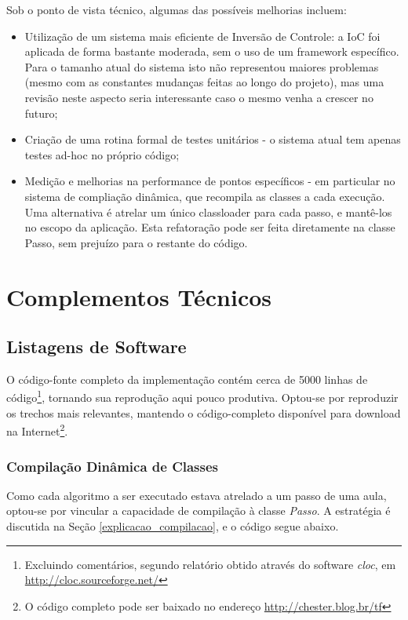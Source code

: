 \documentclass{abnt}
\begin{document}
Sob o ponto de vista técnico, algumas das possíveis melhorias incluem:

\begin{itemize}
\item Utilização de um sistema mais eficiente de Inversão de Controle: a IoC foi aplicada de forma bastante moderada, sem o uso de um framework específico. Para o tamanho atual do sistema isto não representou maiores problemas (mesmo com as constantes mudanças feitas ao longo do projeto), mas uma revisão neste aspecto seria interessante caso o mesmo venha a crescer no futuro;
\item Criação de uma rotina formal de testes unitários - o sistema atual tem apenas testes ad-hoc no próprio código;
\item Medição e melhorias na performance de pontos específicos - em particular no sistema de compliação dinâmica, que recompila as classes a cada execução. Uma alternativa é atrelar um único classloader para cada passo, e mantê-los no escopo da aplicação. Esta refatoração pode ser feita diretamente na classe Passo, sem prejuízo para o restante do código.
\end{itemize}



\appendix
\chapter {Complementos Técnicos}
\section{Listagens de Software}
\label{listagens}
O código-fonte completo da implementação contém cerca de 5000 linhas de código\footnote{Excluindo comentários, segundo relatório obtido através do software \textit{cloc}, em \url{http://cloc.sourceforge.net/}}, tornando sua reprodução aqui pouco produtiva. Optou-se por reproduzir os trechos mais relevantes, mantendo o código-completo disponível para download na Internet\footnote{O código completo pode ser baixado no endereço \url{http://chester.blog.br/tf}}.

\subsection{Compilação Dinâmica de Classes}

Como cada algoritmo a ser executado estava atrelado a um passo de uma aula, optou-se por vincular a capacidade de compilação à classe \textit{Passo}. A estratégia é discutida na Seção \ref{explicacao_compilacao}, e o código segue abaixo.
\end{document}
